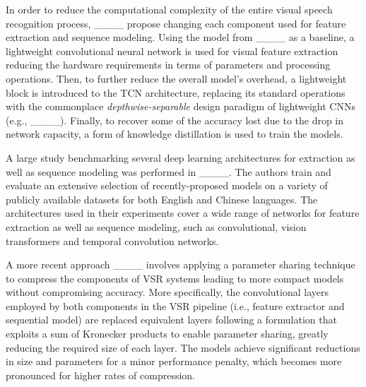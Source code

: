 In order to reduce the computational complexity of the entire visual speech recognition process, ____ propose changing each component used for feature extraction and sequence modeling.
Using the model from ____ as a baseline, a lightweight convolutional neural network is used for visual feature extraction reducing the hardware requirements in terms of parameters and processing operations.
Then, to further reduce the overall model's overhead, a lightweight block is introduced to the TCN architecture, replacing its standard operations with the commonplace \textit{depthwise-separable} design paradigm of lightweight CNNs (e.g., ____).
Finally, to recover some of the accuracy lost due to the drop in network capacity, a form of knowledge distillation is used to train the models.

A large study benchmarking several deep learning architectures for extraction as well as sequence modeling was performed in ____.
The authors train and evaluate an extensive selection of recently-proposed models on a variety of publicly available datasets for both English and Chinese languages.
The architectures used in their experiments cover a wide range of networks for feature extraction as well as sequence modeling, such as convolutional, vision transformers and temporal convolution networks.

A more recent approach ____ involves applying a parameter sharing technique to compress the components of VSR systems leading to more compact models without compromising accuracy.
More specifically, the convolutional layers employed by both components in the VSR pipeline (i.e., feature extractor and sequential model) are replaced equivalent layers following a formulation that exploits a sum of Kronecker products to enable parameter sharing, greatly reducing the required size of each layer.
The models achieve significant reductions in size and parameters for a minor performance penalty, which becomes more pronounced for higher rates of compression.